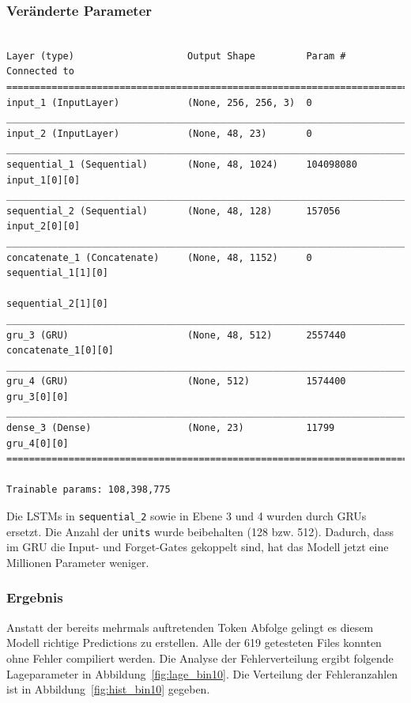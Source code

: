 \documentclass[pdftex,a4paper,halfparskip, article]{scrartcl}
\begin{document}
\subsubsection*{Veränderte Parameter}

\begin{verbatim}

Layer (type)                    Output Shape         Param #     Connected to
=============================================================================
input_1 (InputLayer)            (None, 256, 256, 3)  0
_____________________________________________________________________________
input_2 (InputLayer)            (None, 48, 23)       0
_____________________________________________________________________________
sequential_1 (Sequential)       (None, 48, 1024)     104098080   input_1[0][0]
_____________________________________________________________________________
sequential_2 (Sequential)       (None, 48, 128)      157056      input_2[0][0]
_____________________________________________________________________________
concatenate_1 (Concatenate)     (None, 48, 1152)     0           sequential_1[1][0]
                                                                 sequential_2[1][0]
_____________________________________________________________________________
gru_3 (GRU)                     (None, 48, 512)      2557440     concatenate_1[0][0]
_____________________________________________________________________________
gru_4 (GRU)                     (None, 512)          1574400     gru_3[0][0]
_____________________________________________________________________________
dense_3 (Dense)                 (None, 23)           11799       gru_4[0][0]
=============================================================================

Trainable params: 108,398,775

\end{verbatim}

Die LSTMs in \texttt{sequential\_2} sowie in Ebene 3 und 4 wurden durch GRUs ersetzt. Die Anzahl der \texttt{units} wurde beibehalten (128 bzw. 512). Dadurch, dass im GRU die Input- und Forget-Gates gekoppelt sind, hat das Modell jetzt eine Millionen Parameter weniger.

\subsubsection*{Ergebnis}

Anstatt der bereits mehrmals auftretenden Token Abfolge gelingt es diesem Modell richtige Predictions zu erstellen. Alle der 619 getesteten Files konnten ohne Fehler compiliert werden. Die Analyse der Fehlerverteilung ergibt folgende Lageparameter in Abbildung~\ref{fig:lage_bin10}. Die Verteilung der Fehleranzahlen ist in Abbildung~\ref{fig:hist_bin10} gegeben.
\end{document}
